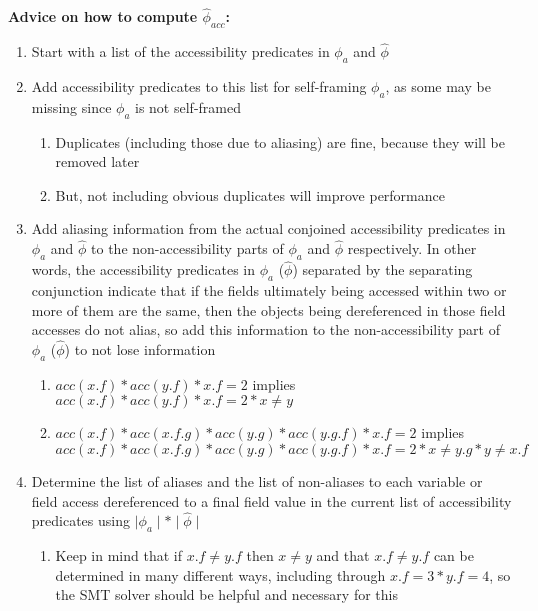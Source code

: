 \documentclass {article}
\newcommand{\fphi}{\widehat{\phi}}
\begin{document}
\textbf{Advice on how to compute $\fphi_{acc}$:}
\begin{enumerate}
\item Start with a list of the accessibility predicates in $\phi_a$ and $\fphi$
\item Add accessibility predicates to this list for self-framing $\phi_a$, as some may be missing since $\phi_a$ is not self-framed
	\begin{enumerate}
	\item Duplicates (including those due to aliasing) are fine, because they will be removed later
	\item But, not including obvious duplicates will improve performance
	\end{enumerate}
\item Add aliasing information from the actual conjoined accessibility predicates in $\phi_a$ and $\fphi$ to the non-accessibility parts of $\phi_a$ and $\fphi$ respectively. In other words, the accessibility predicates in $\phi_a$ ($\fphi$) separated by the separating conjunction indicate that if the fields ultimately being accessed within two or more of them are the same, then the objects being dereferenced in those field accesses do not alias, so add this information to the non-accessibility part of $\phi_a$ ($\fphi$) to not lose information
	\begin{enumerate}
	\item $acc(x.f) \ast acc(y.f) \ast x.f = 2$ implies $acc(x.f) \ast acc(y.f) \ast x.f = 2 \ast x \neq y$
	\item $acc(x.f) \ast acc(x.f.g) \ast acc(y.g) \ast acc(y.g.f) \ast x.f = 2$ implies \\ $acc(x.f) \ast acc(x.f.g) \ast acc(y.g) \ast acc(y.g.f) * x.f = 2 \ast x \neq y.g \ast y \neq x.f$
	\end{enumerate}
\item Determine the list of aliases and the list of non-aliases to each variable or field access dereferenced to a final field value in the current list of accessibility predicates using $\mid \phi_a \mid \ast \mid \fphi \mid$
	\begin{enumerate}
	\item Keep in mind that if $x.f \neq y.f$ then $x \neq y$ and that $x.f \neq y.f$ can be determined in many different ways, including through $x.f = 3 * y.f = 4$, so the SMT solver should be helpful and necessary for this
	\end{enumerate}

\end{enumerate}
\end{document}
